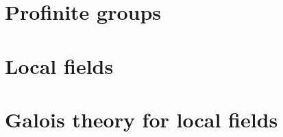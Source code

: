 \documentclass[a4paper,10pt]{article}
\begin{document}
\section{Profinite groups}

\newpage

\section{Local fields}

\newpage

\section{Galois theory for local fields}

\newpage

\begin{thebibliography}{}



\end{thebibliography}

\printindex
\end{document}
